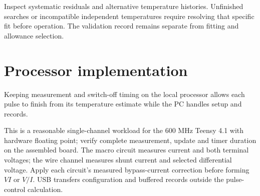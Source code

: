 \documentclass[11pt,letterpaper]{article}
\begin{document}
Inspect systematic residuals and alternative temperature histories. Unfinished searches or incompatible independent temperatures require resolving that specific fit before operation. The validation record remains separate from fitting and allowance selection.

\section{Processor implementation}

Keeping measurement and switch-off timing on the local processor allows each pulse to finish from its temperature estimate while the PC handles setup and records.

This is a reasonable single-channel workload for the 600 MHz Teensy 4.1 with hardware floating point; verify complete measurement, update and timer duration on the assembled board. The macro circuit measures current and both terminal voltages; the wire channel measures shunt current and selected differential voltage. Apply each circuit's measured bypass-current correction before forming \(VI\) or \(V/I\). USB transfers configuration and buffered records outside the pulse-control calculation.
\end{document}
